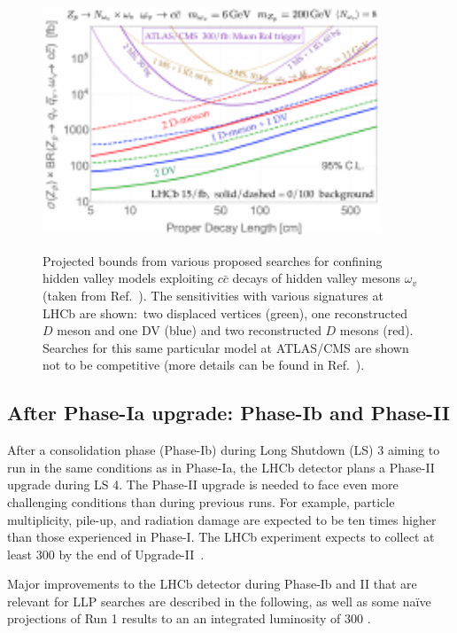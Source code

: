 \begin{figure}[t]
  \centering
  {\includegraphics[width=0.9\textwidth]{figures/lhcb_hvlimits2.pdf}}
  \caption{Projected bounds from various proposed searches for confining hidden valley models exploiting $c\bar{c}$ decays of hidden valley mesons $\omega_v$ (taken from Ref.~\cite{Pierce:2017taw}). The sensitivities with various signatures at LHCb are shown:~two displaced vertices (green), one reconstructed $D$ meson and one DV (blue) and two reconstructed $D$ mesons (red). Searches for this same particular model at ATLAS/CMS are shown not to be competitive (more details can be found in Ref.~\cite{Pierce:2017taw}).}
  \label{fig:HVlim}
\end{figure}

\subsection{After Phase-Ia upgrade: Phase-Ib and Phase-II}
\label{sec:ulhcbphaseii}

After a consolidation phase (Phase-Ib) during Long Shutdown (LS) 3 aiming to run in the same conditions as in Phase-Ia, the LHCb detector plans a Phase-II upgrade during LS 4. The Phase-II upgrade is needed to face even more challenging conditions than during previous runs. For example, particle multiplicity, pile-up, and radiation damage are expected to be ten times higher than those experienced in Phase-I. The LHCb experiment expects to collect at least 300 \invfb by the end of Upgrade-II~\cite{LHCbUpgradeIIPC}.

Major improvements to the LHCb detector during Phase-Ib and II that are relevant for LLP searches are described in the following, as well as some na\"ive projections of Run 1 results to an an integrated luminosity of 300 \invfb.

